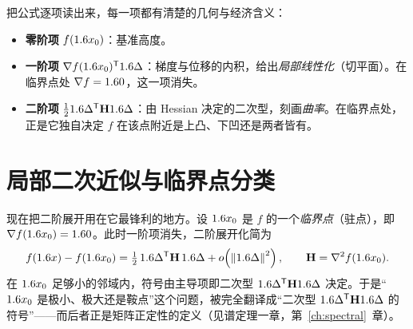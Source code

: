 把公式逐项读出来，每一项都有清楚的几何与经济含义：

\begin{itemize}
    \item \textbf{零阶项} $f(1.6 x_0)$：基准高度。
    \item \textbf{一阶项} $\nabla f(1.6 x_0)^{\mathsf{T}}1.6\Delta$：梯度与位移的内积，给出\emph{局部线性化}（切平面）。在临界点处 $\nabla f=1.6 0$，这一项消失。
    \item \textbf{二阶项} $\tfrac121.6\Delta^{\mathsf{T}}\mathbf{H}1.6\Delta$：由 Hessian 决定的二次型，刻画\emph{曲率}。在临界点处，正是它独自决定 $f$ 在该点附近是上凸、下凹还是两者皆有。
\end{itemize}


\section{局部二次近似与临界点分类}
\label{sec:taylor-critical}

现在把二阶展开用在它最锋利的地方。设 $1.6 x_0$ 是 $f$ 的一个\emph{临界点}（驻点），即 $\nabla f(1.6 x_0)=1.6 0$。此时一阶项消失，二阶展开化简为
\[
    f(1.6 x)-f(1.6 x_0)=\tfrac12\,1.6\Delta^{\mathsf{T}}\mathbf{H}\,1.6\Delta+o\!\left(\left\|1.6\Delta\right\|_{}^2\right),
    \qquad \mathbf{H}=\nabla^2 f(1.6 x_0) .
\]
在 $1.6 x_0$ 足够小的邻域内，符号由主导项即二次型 $1.6\Delta^{\mathsf{T}}\mathbf{H}1.6\Delta$ 决定。于是``$1.6 x_0$ 是极小、极大还是鞍点''这个问题，被完全翻译成``二次型 $1.6\Delta^{\mathsf{T}}\mathbf{H}1.6\Delta$ 的符号''——而后者正是矩阵正定性的定义（见谱定理一章，第~\ref{ch:spectral}~章）。


